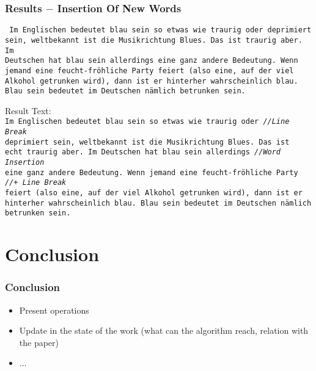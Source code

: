 \documentclass{beamer}
\begin{document}
\begin{frame}
\frametitle{Results $-$ Insertion Of New Words}
\texttt{\tiny
Im Englischen bedeutet blau sein so etwas wie traurig oder deprimiert \\
sein, weltbekannt ist die Musikrichtung Blues. Das ist traurig aber. Im \\
Deutschen hat blau sein allerdings eine ganz andere Bedeutung. Wenn \\
jemand eine feucht-fröhliche Party feiert (also eine, auf der viel \\
Alkohol getrunken wird), dann ist er hinterher wahrscheinlich blau. \\
Blau sein bedeutet im Deutschen nämlich betrunken sein. \\
}

Result Text: \\

\texttt{\scriptsize{I}\tiny m Englischen bedeutet blau sein so etwas wie traurig oder \hskip 58pt \emph{//Line Break} \\
\scriptsize{d}\tiny eprimiert sein, weltbekannt ist die Musikrichtung Blues. Das ist \\
\scriptsize{e}\tiny cht traurig aber. Im Deutschen hat blau sein allerdings \hskip 60pt \emph{//Word Insertion}\\
\scriptsize{e}\tiny ine ganz andere Bedeutung. Wenn jemand eine feucht-fröhliche Party \hskip 30pt \emph{//+ Line Break}\\
feiert (also eine, auf der viel Alkohol getrunken wird), dann ist er \\
hinterher wahrscheinlich blau. Blau sein bedeutet im Deutschen nämlich \\
betrunken sein. \\
}
\end{frame}

\section{Conclusion}

\begin{frame}
\frametitle{Conclusion}
\begin{itemize}
\item Present operations
\item Update in the state of the work (what can the algorithm reach, relation with the paper)
\item ...
\end{itemize}
\end{frame}
\end{document}

